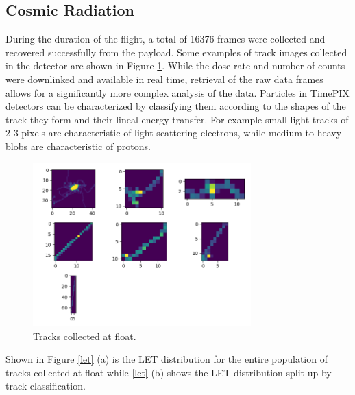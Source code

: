 \subsection{Cosmic Radiation}
\label{sec:Cosmic-Radiation-Results}

During the duration of the flight, a total of 16376 frames were collected and recovered successfully from the payload. Some examples of track images collected in the detector are shown in Figure \ref{tracks}. While the dose rate and number of counts were downlinked and available in real time, retrieval of the raw data frames allows for a significantly more complex analysis of the data. Particles in TimePIX detectors can be characterized by classifying them according to the shapes of the track they form and their lineal energy transfer. %
For example small light tracks of 2-3 pixels are characteristic of light scattering electrons, while medium to heavy blobs are characteristic of protons.


\begin{figure}[H]
	\begin{center}
	\includegraphics[width=0.75\textwidth]{figures/tracks.png}
	\caption{Tracks collected at float.}
	\label{tracks}
	\end{center}
\end{figure}

Shown in Figure \ref{let} (a) is the LET distribution for the entire population of tracks collected at float while \ref{let} (b) shows the LET distribution split up by track classification.

